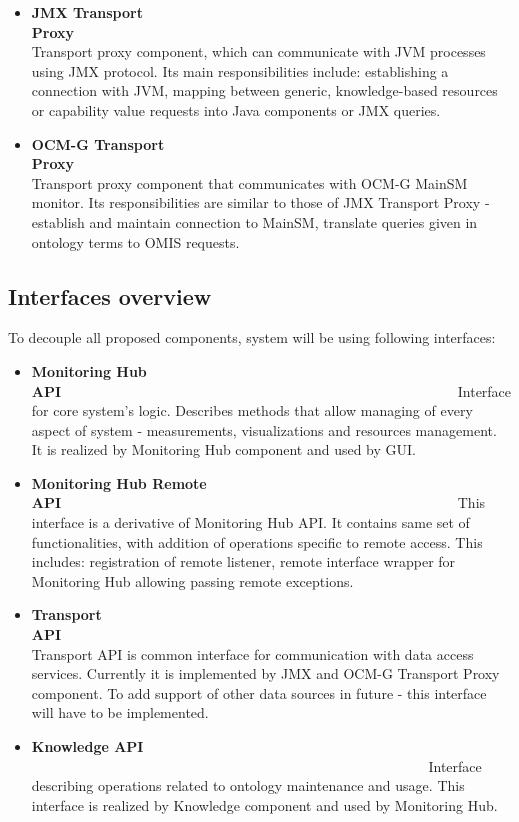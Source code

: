 \begin{itemize}
\item {\bf JMX Transport Proxy}~~~~~~~~~~~~~~~~~~~~~~~~~~~~~~~~~~~~~~~~~~~~~~~~~~~~~~~~\linebreak
Transport proxy component, which can communicate with JVM processes using JMX protocol. Its main responsibilities include: establishing a connection with JVM, mapping between generic, knowledge-based resources or capability value requests into Java components or JMX queries.

\item {\bf OCM-G Transport Proxy}~~~~~~~~~~~~~~~~~~~~~~~~~~~~~~~~~~~~~~~~~~~~~~~~~~~~~~~~\linebreak
Transport proxy component that communicates with OCM-G MainSM monitor. Its responsibilities are similar to those of JMX Transport Proxy - establish and maintain connection to MainSM, translate queries given in ontology terms to OMIS requests.

\end{itemize}

\subsection{Interfaces overview}

To decouple all proposed components, system will be using following interfaces:

\begin{itemize}

\item {\bf Monitoring Hub API}~~~~~~~~~~~~~~~~~~~~~~~~~~~~~~~~~~~~~~~~~~~~~~~~~~~~~~~~\linebreak
Interface for core system's logic. Describes methods that allow managing of every aspect of system - measurements, visualizations and resources management. It is realized by Monitoring Hub component and used by GUI. 

\item {\bf Monitoring Hub Remote API}~~~~~~~~~~~~~~~~~~~~~~~~~~~~~~~~~~~~~~~~~~~~~~~~~~~~~~~~\linebreak
This interface is a derivative of Monitoring Hub API. It contains same set of functionalities, with addition of operations specific to remote access. This includes: registration of remote listener, remote interface wrapper for Monitoring Hub allowing passing remote exceptions.

\item {\bf Transport API}~~~~~~~~~~~~~~~~~~~~~~~~~~~~~~~~~~~~~~~~~~~~~~~~~~~~~~~~\linebreak
Transport API is common interface for communication with data access services. Currently it is implemented by JMX and OCM-G Transport Proxy component. To add support of other data sources in future - this interface will have to be implemented.

\item {\bf Knowledge API} ~~~~~~~~~~~~~~~~~~~~~~~~~~~~~~~~~~~~~~~~~~~~~~~~~~~~~~~~\linebreak
Interface describing operations related to ontology maintenance and usage. This interface is realized by Knowledge component and used by Monitoring Hub. 

\end{itemize}

